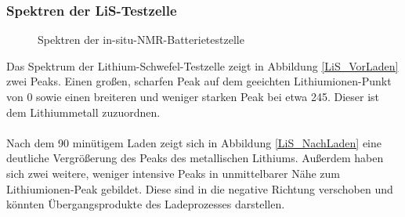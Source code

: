 \documentclass[a4paper, 11pt, headsepline,footsepline,twoside,abstract]{scrbook}
\begin{document}
\subsubsection{Spektren der LiS-Testzelle}
\begin{figure}
   \centering
       \vspace{10mm}
       \vspace{6mm}
	\caption{Spektren der in-situ-NMR-Batterietestzelle}
   	\label{insitu_nmr}
\end{figure}  
Das Spektrum der Lithium-Schwefel-Testzelle zeigt in Abbildung \ref{LiS_VorLaden} zwei Peaks. Einen großen, scharfen Peak auf dem geeichten Lithiumionen-Punkt von \SI{0}{\nmrppm} sowie einen breiteren und weniger starken Peak bei etwa \SI{245}{\nmrppm}. Dieser ist dem Lithiummetall zuzuordnen.
\\\\
Nach dem 90 minütigem Laden zeigt sich in Abbildung \ref{LiS_NachLaden} eine deutliche Vergrößerung des Peaks des metallischen Lithiums. Außerdem haben sich zwei weitere, weniger intensive Peaks in unmittelbarer Nähe zum Lithiumionen-Peak gebildet. Diese sind in die negative Richtung verschoben und könnten Übergangsprodukte des Ladeprozesses darstellen.
\newpage
\end{document}
